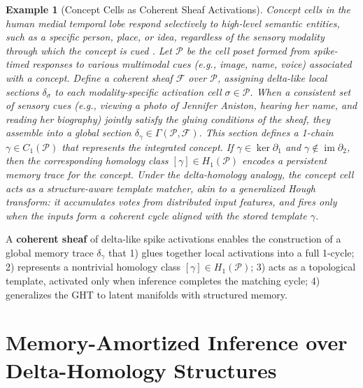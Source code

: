\documentclass[lettersize,journal]{IEEEtran}
\newtheorem{example}{Example}
\begin{document}
\begin{example}[Concept Cells as Coherent Sheaf Activations]
Concept cells in the human medial temporal lobe respond selectively to high-level semantic entities, such as a specific person, place, or idea, regardless of the sensory modality through which the concept is cued \cite{quiroga2012concept}. Let \( \mathcal{P} \) be the cell poset formed from spike-timed responses to various multimodal cues (e.g., image, name, voice) associated with a concept. Define a coherent sheaf \( \mathcal{F} \) over \( \mathcal{P} \), assigning delta-like local sections \( \delta_\sigma \) to each modality-specific activation cell \( \sigma \in \mathcal{P} \).
When a consistent set of sensory cues (e.g., viewing a photo of Jennifer Aniston, hearing her name, and reading her biography) jointly satisfy the gluing conditions of the sheaf, they assemble into a global section \( \delta_\gamma \in \Gamma(\mathcal{P}, \mathcal{F}) \). This section defines a 1-chain \( \gamma \in C_1(\mathcal{P}) \) that represents the integrated concept. If \( \gamma \in \ker \partial_1 \) and \( \gamma \notin \operatorname{im} \partial_2 \), then the corresponding homology class \( [\gamma] \in H_1(\mathcal{P}) \) encodes a persistent memory trace for the concept.
Under the delta-homology analogy, the concept cell acts as a structure-aware template matcher, akin to a generalized Hough transform: it accumulates votes from distributed input features, and fires only when the inputs form a coherent cycle aligned with the stored template \( \gamma \). %
\end{example}



\begin{tcolorbox}[colback=blue!5, colframe=blue!60!black, title=Key Bridge: Sheaf Coherence $\rightarrow$ Delta-Homology $\rightarrow$ Topological Template Matching]
A \textbf{coherent sheaf} of delta-like spike activations enables the construction of a global memory trace \( \delta_\gamma \) that 1) glues together local activations into a full 1-cycle;
2) represents a nontrivial homology class \( [\gamma] \in H_1(\mathcal{P}) \);
 3) acts as a topological template, activated only when inference completes the matching cycle;
4) generalizes the GHT to latent manifolds with structured memory.
\end{tcolorbox}


\section{Memory-Amortized Inference over Delta-Homology Structures}
\label{sec:MAI}
\end{document}
